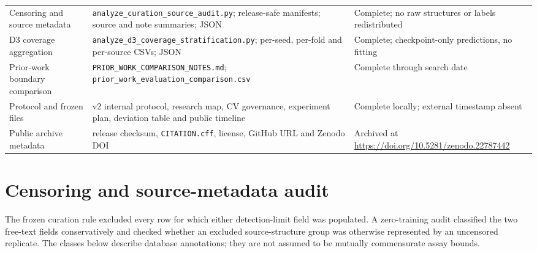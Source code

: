 \documentclass[10pt]{article}
\begin{document}
\begin{table}[htbp]
\begin{tabularx}{\textwidth}{>{\raggedright\arraybackslash}p{}>{\raggedright\arraybackslash}X>{\raggedright\arraybackslash}p{}}
Censoring and source metadata & \texttt{analyze\_\allowbreak{}curation\_\allowbreak{}source\_\allowbreak{}audit.py}; release-safe manifests; source and note summaries; JSON & Complete; no raw structures or labels redistributed \\
D3 coverage aggregation & \texttt{analyze\_\allowbreak{}d3\_\allowbreak{}coverage\_\allowbreak{}stratification.py}; per-seed, per-fold and per-source CSVs; JSON & Complete; checkpoint-only predictions, no fitting \\
Prior-work boundary comparison & \texttt{PRIOR\_\allowbreak{}WORK\_\allowbreak{}COMPARISON\_\allowbreak{}NOTES.md}; \texttt{prior\_\allowbreak{}work\_\allowbreak{}evaluation\_\allowbreak{}comparison.csv} & Complete through search date \\
Protocol and frozen files & v2 internal protocol, research map, CV governance, experiment plan, deviation table and public timeline & Complete locally; external timestamp absent \\
Public archive metadata & release checksum, \texttt{CITATION.cff}, license, GitHub URL and Zenodo DOI & Archived at \url{https://doi.org/10.5281/zenodo.22787442} \\
\bottomrule
\end{tabularx}
\end{table}

\section*{Censoring and source-metadata audit}

The frozen curation rule excluded every row for which either detection-limit field was populated. A zero-training audit classified the two free-text fields conservatively and checked whether an excluded source-structure group was otherwise represented by an uncensored replicate. The classes below describe database annotations; they are not assumed to be mutually commensurate assay bounds.
\end{document}
